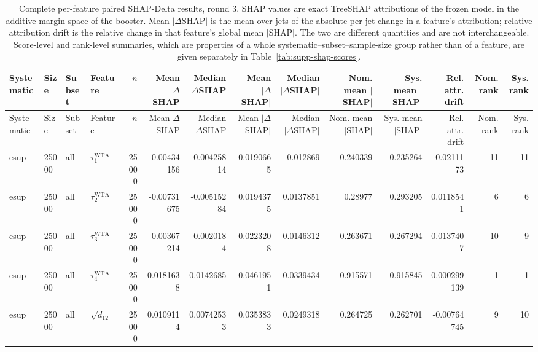 \begin{landscape}
\scriptsize
\setlength{\tabcolsep}{1.6pt}
\begin{longtable}{llll r rrrr rr r rr}
\caption{Complete per-feature paired SHAP-Delta results, round 3. SHAP values are exact TreeSHAP attributions of the frozen model in the additive margin space of the booster. Mean $|\Delta$SHAP$|$ is the mean over jets of the absolute per-jet change in a feature's attribution; relative attribution drift is the relative change in that feature's global mean $|$SHAP$|$. The two are different quantities and are not interchangeable. Score-level and rank-level summaries, which are properties of a whole systematic--subset--sample-size group rather than of a feature, are given separately in Table~\ref{tab:supp-shap-scores}.}
\label{tab:supp-shap-per-feature}\\
\toprule
Systematic & Size & Subset & Feature & $n$ & Mean $\Delta$SHAP & Median $\Delta$SHAP & Mean $|\Delta$SHAP$|$ & Median $|\Delta$SHAP$|$ & Nom. mean $|$SHAP$|$ & Sys. mean $|$SHAP$|$ & Rel. attr. drift & Nom. rank & Sys. rank \\
\midrule
\endfirsthead
\toprule
Systematic & Size & Subset & Feature & $n$ & Mean $\Delta$SHAP & Median $\Delta$SHAP & Mean $|\Delta$SHAP$|$ & Median $|\Delta$SHAP$|$ & Nom. mean $|$SHAP$|$ & Sys. mean $|$SHAP$|$ & Rel. attr. drift & Nom. rank & Sys. rank \\
\midrule
\endhead
\bottomrule
\endfoot
esup & 25000 & all & $\tau_1^{\mathrm{WTA}}$ & 25000 & -0.00434156 & -0.00425814 & 0.0190665 & 0.012869 & 0.240339 & 0.235264 & -0.0211173 & 11 & 11 \\
esup & 25000 & all & $\tau_2^{\mathrm{WTA}}$ & 25000 & -0.00731675 & -0.00515284 & 0.0194375 & 0.0137851 & 0.28977 & 0.293205 & 0.0118541 & 6 & 6 \\
esup & 25000 & all & $\tau_3^{\mathrm{WTA}}$ & 25000 & -0.00367214 & -0.0020184 & 0.0223208 & 0.0146312 & 0.263671 & 0.267294 & 0.0137407 & 10 & 9 \\
esup & 25000 & all & $\tau_4^{\mathrm{WTA}}$ & 25000 & 0.0181638 & 0.0142685 & 0.0461951 & 0.0339434 & 0.915571 & 0.915845 & 0.000299139 & 1 & 1 \\
esup & 25000 & all & $\sqrt{d_{12}}$ & 25000 & 0.0109114 & 0.00742533 & 0.0353833 & 0.0249318 & 0.264725 & 0.262701 & -0.00764745 & 9 & 10 \\

\end{longtable}
\end{landscape}

